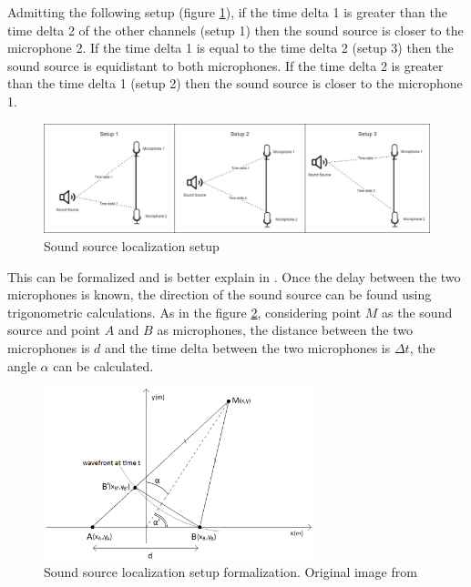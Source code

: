 Admitting the following setup (figure \ref*{fig:microphones_setup}), if the time delta 1 is greater than the time delta 2 of the other channels (setup 1) then the sound source is closer to the microphone 2. If the time delta 1 is equal to the time delta 2 (setup 3) then the sound source is equidistant to both microphones. If the time delta 2 is greater than the time delta 1 (setup 2) then the sound source is closer to the microphone 1. 

\begin{figure}[H]
    \centering
    \includegraphics[width=1\textwidth]{../Images/microphones_setups.png}
    \caption{Sound source localization setup}
    \label{fig:microphones_setup}
\end{figure}

This can be formalized and is better explain in \cite{Scola2010DirectionOA}. Once the delay between the two microphones is known, the direction of the sound source can be found using trigonometric calculations. As in the figure \ref*{fig:sound-source-from-two-microphones}, considering point $M$ as the sound source and point $A$ and $B$ as microphones, the distance between the two microphones is $d$ and the time delta between the two microphones is $\Delta t$, the angle $\alpha$ can be calculated.

\begin{figure}[H]
    \centering
    \includegraphics[width=0.7\textwidth]{../Images/sound-source-from-two-microphones.png}
    \caption{Sound source localization setup formalization. Original image from \cite{Scola2010DirectionOA}}
    \label{fig:sound-source-from-two-microphones}
\end{figure}

